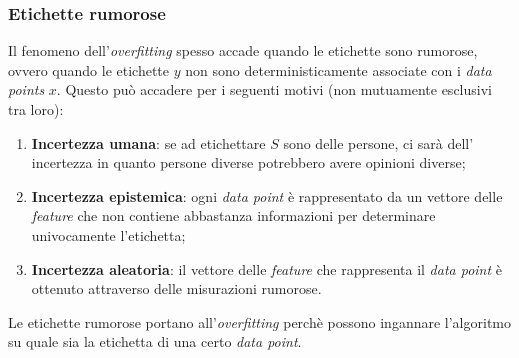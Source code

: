 \subsubsection{Etichette rumorose}
Il fenomeno dell'\textit{overfitting} spesso accade quando le etichette sono rumorose, ovvero
quando le etichette $y$ non sono deterministicamente associate con i \textit{data points} $x$.
Questo può accadere per i seguenti motivi (non mutuamente esclusivi tra loro):
\begin{enumerate}
    \item \textbf{Incertezza umana}: se ad etichettare $S$ sono delle persone, ci sarà dell'
        incertezza in quanto persone diverse potrebbero avere opinioni diverse;
    \item \textbf{Incertezza epistemica}: ogni \textit{data point} è rappresentato da un 
        vettore delle \textit{feature} che non contiene abbastanza informazioni per determinare
        univocamente l'etichetta;
    \item \textbf{Incertezza aleatoria}: il vettore delle \textit{feature} che rappresenta il
        \textit{data point} è ottenuto attraverso delle misurazioni rumorose.
\end{enumerate}

Le etichette rumorose portano all'\textit{overfitting} perchè possono ingannare l'algoritmo su
quale sia la  etichetta di una certo \textit{data point}.